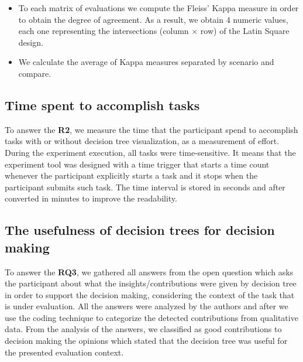\begin{itemize}
    \item To each matrix of evaluations we compute the Fleiss’ Kappa measure in order to obtain the degree of agreement. As a result, we obtain 4 numeric values, each one representing the intersections (column $\times$ row) of the Latin Square design.
    
    \item We calculate the average of Kappa measures separated by scenario and compare.
\end{itemize}



\subsection{Time spent to accomplish tasks}

To answer the \textbf{R2}, we measure the time that the participant spend to
accomplish tasks with or without decision tree visualization, as a measurement of effort. During the experiment execution, all tasks were time-sensitive. It means that the experiment tool was designed with a time trigger that starts a time count whenever the participant explicitly starts a task and it stops when the participant submits such task. The time interval is stored in seconds and after converted in minutes to improve the readability.

\subsection{The usefulness of decision trees for decision making}

To answer the \textbf{RQ3}, we gathered all answers from the open question which asks the participant about what the insights/contributions were given by decision tree in order to support the decision making, considering the context of the task that is under evaluation. All the answers were analyzed by the authors and after we use the coding technique 
\cite{seaman1999qualitative} to categorize the detected contributions from qualitative data. From the analysis of the answers, we classified as good contributions to decision making the opinions which stated that the decision tree was useful for the presented evaluation context. 


